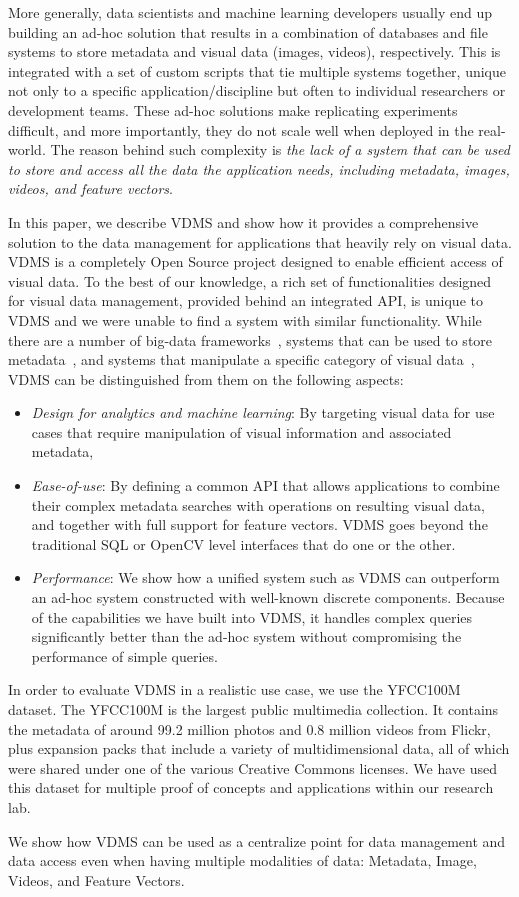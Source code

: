 More generally, data scientists and machine learning developers
usually end up building an ad-hoc solution that results in a
combination of databases and file systems to store
metadata and visual data (images, videos), respectively.
This is integrated with a set of custom scripts that tie multiple systems together,
unique not only to a specific application/discipline but often
to individual researchers or development teams.
These ad-hoc solutions make replicating experiments difficult,
and more importantly, they do not scale well when deployed in the real-world.
The reason behind such complexity is \textit{the lack of a system
that can be used to store and access all the data the application needs,
including metadata, images, videos, and feature vectors}.

In this paper, we describe VDMS and show how it provides a
comprehensive solution to the data management for applications
that heavily rely on visual data.
VDMS is a completely Open Source project designed to enable
efficient access of visual data.
To the best of our knowledge, a rich set of functionalities
designed for visual data management, provided behind an integrated API,
is unique to VDMS and we were unable to find a system with similar functionality.
While there are a number of big-data frameworks~\cite{spark, hadoop}, systems
that can be used to store metadata~\cite{memsql, vertica}, and systems that
manipulate a specific category of visual data~\cite{scidb, rasdaman}, VDMS can
be distinguished from them on the following aspects:

\begin{itemize}
\item {\em Design for analytics and machine learning}: By targeting
visual data for use cases that require manipulation
of visual information and associated metadata,
\item {\em Ease-of-use}: By defining a common API that allows applications to
combine their complex metadata searches with operations on resulting visual
data, and together with full support for feature vectors. VDMS goes beyond the
traditional SQL or OpenCV level interfaces that do one or the other.
\item {\em Performance}: We show how a unified system such as VDMS can
outperform an ad-hoc system constructed with well-known discrete components.
Because of the capabilities we have built into VDMS, it handles complex
queries significantly better than the ad-hoc system without compromising the
performance of simple queries.
\end{itemize}

In order to evaluate VDMS in a realistic use case,
we use the YFCC100M dataset\cite{Thomee_2016}.
The YFCC100M is the largest public multimedia collection.
It contains the metadata of around 99.2 million photos
and 0.8 million videos from Flickr,
plus expansion packs that include a variety of multidimensional data,
all of which were shared under one of the various Creative Commons licenses.
We have used this dataset
for multiple proof of concepts and applications within our research lab.

We show how VDMS can be used as a centralize point for data
management and data access even when having multiple modalities of data:
Metadata, Image, Videos, and Feature Vectors.
